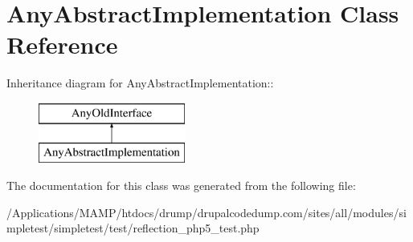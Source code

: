 \hypertarget{class_any_abstract_implementation}{
\section{AnyAbstractImplementation Class Reference}
\label{class_any_abstract_implementation}
}
Inheritance diagram for AnyAbstractImplementation::\begin{figure}[H]
\begin{center}
\leavevmode
\includegraphics[height=2cm]{class_any_abstract_implementation}
\end{center}
\end{figure}


The documentation for this class was generated from the following file:\begin{DoxyCompactItemize}
\item 
/Applications/MAMP/htdocs/drump/drupalcodedump.com/sites/all/modules/simpletest/simpletest/test/reflection\_\-php5\_\-test.php\end{DoxyCompactItemize}
